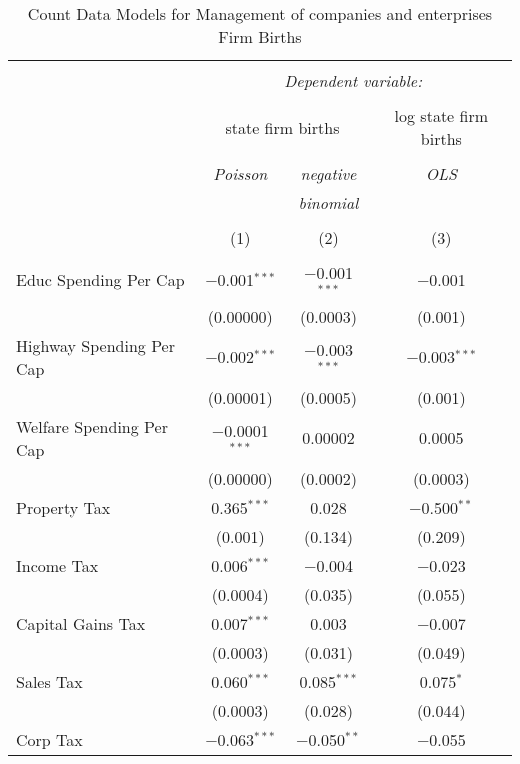 
\begin{table}[!htbp] \centering 
  \caption{Count Data Models for Management of companies and enterprises Firm Births} 
  \label{} 
\begin{tabular}{@{\extracolsep{5pt}}lccc} 
\\[-1.8ex]\hline 
\hline \\[-1.8ex] 
 & \multicolumn{3}{c}{\textit{Dependent variable:}} \\ 
\cline{2-4} 
\\[-1.8ex] & \multicolumn{2}{c}{state firm births} & log state firm births \\ 
\\[-1.8ex] & \textit{Poisson} & \textit{negative} & \textit{OLS} \\ 
 & \textit{} & \textit{binomial} & \textit{} \\ 
\\[-1.8ex] & (1) & (2) & (3)\\ 
\hline \\[-1.8ex] 
 Educ Spending Per Cap & $-$0.001$^{***}$ & $-$0.001$^{***}$ & $-$0.001 \\ 
  & (0.00000) & (0.0003) & (0.001) \\ 
  Highway Spending Per Cap  & $-$0.002$^{***}$ & $-$0.003$^{***}$ & $-$0.003$^{***}$ \\ 
  & (0.00001) & (0.0005) & (0.001) \\ 
  Welfare Spending Per Cap  & $-$0.0001$^{***}$ & 0.00002 & 0.0005 \\ 
  & (0.00000) & (0.0002) & (0.0003) \\ 
  Property Tax & 0.365$^{***}$ & 0.028 & $-$0.500$^{**}$ \\ 
  & (0.001) & (0.134) & (0.209) \\ 
  Income Tax & 0.006$^{***}$ & $-$0.004 & $-$0.023 \\ 
  & (0.0004) & (0.035) & (0.055) \\ 
  Capital Gains Tax & 0.007$^{***}$ & 0.003 & $-$0.007 \\ 
  & (0.0003) & (0.031) & (0.049) \\ 
  Sales Tax & 0.060$^{***}$ & 0.085$^{***}$ & 0.075$^{*}$ \\ 
  & (0.0003) & (0.028) & (0.044) \\ 
  Corp Tax & $-$0.063$^{***}$ & $-$0.050$^{**}$ & $-$0.055 \\ 

\end{tabular}
\end{table}
